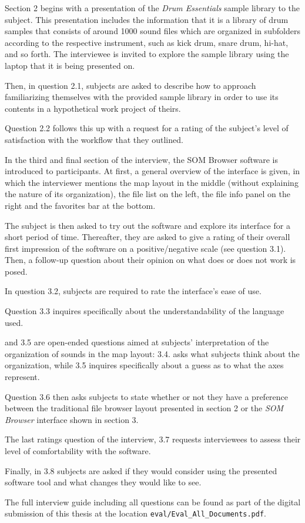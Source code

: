 \bigskip

Section 2 begins with a presentation of the \textit{Drum Essentials} sample
library to the subject. This presentation includes the information that it is a
library of drum samples that consists of around 1000 sound files which are
organized in subfolders according to the respective instrument, such as kick
drum, snare drum, hi-hat, and so forth. The interviewee is invited to explore
the sample library using the laptop that it is being presented on.

\pagebreak
Then, in question 2.1, subjects are asked to describe how to approach
familiarizing themselves with the provided sample library in order to use its
contents in a hypothetical work project of theirs.

\medskip
Question 2.2 follows this up with a
request for a rating of the subject's level of satisfaction with the workflow
that they outlined.

\bigskip

In the third and final section of the interview, the SOM Browser software is
introduced to participants. At first, a general overview of the interface is
given, in which the interviewer mentions the map layout in the middle (without
explaining the nature of its organization), the file list on the left, the file
info panel on the right and the favorites bar at the bottom.

\medskip
The subject is
then asked to try out the software and explore its interface for a short period
of time. Thereafter, they are asked to give a rating of their overall first
impression of the software on a positive/negative scale (see question 3.1).
Then, a follow-up question about their opinion on what does or does not work is
posed.

\medskip
In question 3.2, subjects are required to rate the interface's ease of
use.

\medskip
Question 3.3 inquires specifically about the understandability of the
language used.

 and 3.5 are open-ended questions aimed at subjects'
interpretation of the organization of sounds in the map layout: 3.4. asks what
subjects think about the organization, while 3.5 inquires specifically about
a guess as to what the axes represent.

\medskip
Question 3.6 then asks subjects to state whether or not they have a preference
between the traditional file browser layout presented in section 2 or the
\textit{SOM Browser} interface shown in section 3.

\medskip
The last ratings question of the interview, 3.7 requests interviewees to assess
their level of comfortability with the software.

\medskip
Finally, in 3.8 subjects are asked if they would consider using the presented
software tool and what changes they would like to see.

\bigskip

The full interview guide including all questions can be found as part of the
digital submission of this thesis at the location
\texttt{eval/Eval\_All\_Documents.pdf}.
